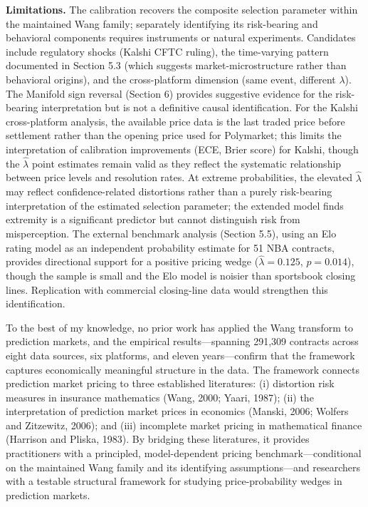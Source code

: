 \documentclass[12pt,a4paper]{article}
\begin{document}
\textbf{Limitations.} The calibration recovers the composite selection parameter within the maintained Wang family;
separately identifying its risk-bearing and behavioral components
requires instruments or natural experiments. Candidates include regulatory shocks (Kalshi CFTC
ruling), the time-varying pattern documented in Section 5.3 (which
suggests market-microstructure rather than behavioral origins), and the
cross-platform dimension (same event, different \(\lambda\)). The
Manifold sign reversal (Section 6) provides suggestive evidence for the
risk-bearing interpretation but is not a definitive causal
identification. For the Kalshi cross-platform analysis, the available
price data is the last traded price before settlement rather than the
opening price used for Polymarket; this limits the interpretation of
calibration improvements (ECE, Brier score) for Kalshi, though the
\(\hat{\lambda}\) point estimates remain valid as they reflect the
systematic relationship between price levels and resolution rates. At
extreme probabilities, the elevated \(\hat{\lambda}\) may reflect
confidence-related distortions rather than a purely risk-bearing
interpretation of the estimated selection parameter; the extended model
finds extremity is a significant predictor but cannot distinguish risk
from misperception. The external benchmark analysis (Section 5.5), using an
Elo rating model as an independent probability estimate for 51 NBA
contracts, provides directional support for a positive pricing wedge
(\(\hat{\lambda} = 0.125\), \(p = 0.014\)), though the sample is small
and the Elo model is noisier than sportsbook closing lines. Replication
with commercial closing-line data would strengthen this identification.

To the best of my knowledge, no prior work has applied the Wang transform to prediction markets, and
the empirical results---spanning 291,309 contracts across eight data
sources, six platforms, and eleven years---confirm that the framework
captures economically meaningful structure in the data. The framework
connects prediction market pricing to three established literatures: (i)
distortion risk measures in insurance mathematics (Wang, 2000; Yaari,
1987); (ii) the interpretation of prediction market prices in economics
(Manski, 2006; Wolfers and Zitzewitz, 2006); and (iii) incomplete market
pricing in mathematical finance (Harrison and Pliska, 1983). By bridging
these literatures, it provides practitioners with a principled,
model-dependent pricing benchmark---conditional on the
maintained Wang family and its identifying assumptions---and researchers
with a testable structural framework for studying price-probability
wedges in prediction markets.
\end{document}
